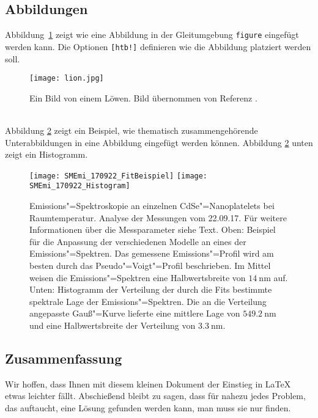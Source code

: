 \subsection{Abbildungen}
\label{subsec:Abb}
Abbildung~\ref{fig:figureone} zeigt wie eine Abbildung in der Gleitumgebung \verb"figure" eingefügt werden kann. Die Optionen \verb"[htb!]" definieren wie die Abbildung platziert werden soll.
\begin{figure}[htb!]
 \centering
 \texttt{[image: lion.jpg]}
 \caption{\label{fig:figureone}  Ein Bild von einem Löwen. Bild übernommen von Referenz \cite{Internetbildquelle}.}
\end{figure}\\
%
Abbildung \ref{fig:vieleBilder} zeigt ein Beispiel, wie thematisch zusammengehörende Unterabbildungen in eine Abbildung eingefügt werden können. Abbildung \ref{fig:vieleBilder} unten zeigt ein Histogramm. 
%
\begin{figure}[h!tb]
\centering
  \texttt{[image: SMEmi\_170922\_FitBeispiel]}
\hfill
  \texttt{[image: SMEmi\_170922\_Histogram]}
\caption{Emissions"=Spektroskopie an einzelnen CdSe"=Nanoplatelets bei Raumtemperatur. Analyse der Messungen vom 22.09.17. Für weitere Informationen über die Messparameter siehe Text. Oben: Beispiel für die Anpassung der verschiedenen Modelle an eines der Emissions"=Spektren. Das gemessene Emissions"=Profil wird am besten durch das Pseudo"=Voigt"=Profil beschrieben. Im Mittel weisen die Emissions"=Spektren eine Halbwertsbreite von $\SI{14}{\nano\meter}$ auf. Unten: Histogramm der Verteilung der durch die Fits bestimmte spektrale Lage der Emissions"=Spektren. Die an die Verteilung angepasste Gauß"=Kurve lieferte eine mittlere Lage von $\SI{549,2}{\nano\meter}$ und eine Halbwertsbreite der Verteilung von $\SI{3,3}{\nano\meter}$.}
\label{fig:vieleBilder}
\end{figure}
\newline
%
\subsection{Zusammenfassung}
\label{subsec:ZusammenLatex}
%
Wir hoffen, dass Ihnen mit diesem kleinen Dokument der Einstieg in \LaTeX{} etwas leichter fällt. Abschießend bleibt zu sagen, dass für nahezu jedes Problem, das auftaucht, eine Lösung gefunden werden kann, man muss sie nur finden.